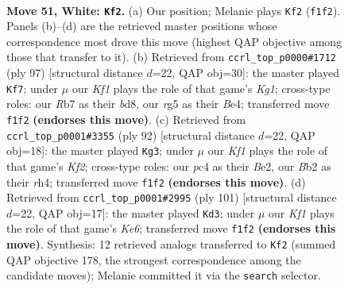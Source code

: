 \documentclass[11pt]{article}
\begin{document}
\clearpage

\begin{figure}[p]\centering
\begin{subfigure}{0.46\textwidth}\centering
\resizebox{\linewidth}{!}{%
\newchessgame
\chessboard[
  setfen={3k4/1R6/8/pp4r1/b1p5/P1P5/1B6/5K2 w - - 8 51},
  showmover=false,
  pgfstyle=straightmove, color=movearrow, markmove={f1-f2}
]}
\caption{}
\end{subfigure}\hfill
\begin{subfigure}{0.46\textwidth}\centering
\resizebox{\linewidth}{!}{%
\newchessgame
\chessboard[
  setfen={3B2k1/8/5pp1/7p/P3b2P/2R3P1/r7/5K2 b - - 1 49},
  showmover=false,
  pgfstyle=straightmove, color=movearrow, markmove={g8-f7}
]}
\caption{}
\end{subfigure}
\\[4pt]
\begin{subfigure}{0.46\textwidth}\centering
\resizebox{\linewidth}{!}{%
\newchessgame
\chessboard[
  setfen={8/1p6/6k1/PPR2p2/4b2r/8/4BK2/8 w - - 0 47},
  showmover=false,
  pgfstyle=straightmove, color=movearrow, markmove={f2-g3}
]}
\caption{}
\end{subfigure}\hfill
\begin{subfigure}{0.46\textwidth}\centering
\resizebox{\linewidth}{!}{%
\newchessgame
\chessboard[
  setfen={8/8/5R2/7p/1B4bP/P1P1k1P1/r7/6K1 b - - 26 51},
  showmover=false,
  pgfstyle=straightmove, color=movearrow, markmove={e3-d3}
]}
\caption{}
\end{subfigure}
\caption{\textbf{Move 51, White: \texttt{Kf2}.} (a) Our position; Melanie plays \texttt{Kf2} (\texttt{f1f2}). Panels (b)--(d) are the retrieved master positions whose correspondence most drove this move (highest QAP objective among those that transfer to it). (b) Retrieved from \texttt{ccrl\_top\_p0000\#1712} (ply 97) [structural distance $d$=22, QAP obj=30]: the master played \texttt{Kf7}; under $\mu$ our \emph{Kf1} plays the role of that game's \emph{Kg1}; cross-type roles: our \emph{R}b7 as their \emph{b}d8, our \emph{r}g5 as their \emph{B}e4; transferred move \texttt{f1f2} \textbf{(endorses this move)}. (c) Retrieved from \texttt{ccrl\_top\_p0001\#3355} (ply 92) [structural distance $d$=22, QAP obj=18]: the master played \texttt{Kg3}; under $\mu$ our \emph{Kf1} plays the role of that game's \emph{Kf2}; cross-type roles: our \emph{p}c4 as their \emph{B}e2, our \emph{B}b2 as their \emph{r}h4; transferred move \texttt{f1f2} \textbf{(endorses this move)}. (d) Retrieved from \texttt{ccrl\_top\_p0001\#2995} (ply 101) [structural distance $d$=22, QAP obj=17]: the master played \texttt{Kd3}; under $\mu$ our \emph{Kf1} plays the role of that game's \emph{Ke6}; transferred move \texttt{f1f2} \textbf{(endorses this move)}. Synthesis: 12 retrieved analogs transferred to \texttt{Kf2} (summed QAP objective 178, the strongest correspondence among the candidate moves); Melanie committed it via the \texttt{search} selector.}
\label{fig:thought-m100}
\end{figure}
\end{document}
